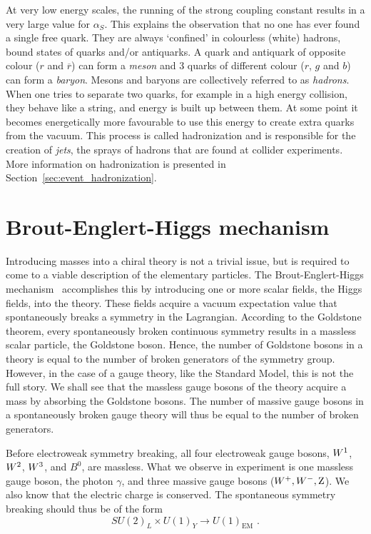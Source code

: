 At very low energy scales, the running of the strong coupling constant results in a very large
value for $\alpha_S$. This explains the observation that no one has ever found a single free quark. 
They are always `confined' in colourless (white) hadrons, \ie bound states of quarks and/or
antiquarks.  A quark and antiquark of opposite colour (\eg $r$ and $\overline{r}$) can form a
\textit{meson} and 3 quarks of different colour ($r$, $g$ and $b$) can form a \textit{baryon}. 
Mesons and baryons are collectively referred to as \textit{hadrons}.
When one tries to separate two quarks, for example in a high energy collision, they behave like a
string, and energy is built up between them. At some point it becomes energetically more favourable
to use this energy to create extra quarks from the vacuum. 
This process is called hadronization and is responsible for the creation of \textsl{jets}, the
sprays of hadrons that are found at collider experiments. More information on hadronization is
presented in Section~\ref{sec:event_hadronization}.


\section{Brout-Englert-Higgs mechanism \label{sec:SM_HiggsMechanism}}

Introducing masses into a chiral theory is not a trivial issue, but is required to come to a viable
description of the elementary particles. 
The Brout-Englert-Higgs mechanism~\cite{Englert:1964et,Higgs:1964pj} accomplishes this by
introducing one or more scalar fields, the
Higgs fields, into the theory. These fields acquire a vacuum expectation value that spontaneously
breaks a symmetry in the Lagrangian. 
According to the Goldstone theorem, every spontaneously broken continuous symmetry
results in a massless scalar particle, the Goldstone boson. 
Hence, the number of Goldstone bosons in a theory is equal to the number of broken generators of
the symmetry group. 
However, in the case of a gauge theory, like the Standard Model, this is not the full story. 
We shall see that the massless gauge bosons of the theory acquire a mass by absorbing the Goldstone
bosons. 
The number of massive gauge bosons in a spontaneously broken gauge theory will thus be equal to the
number of broken generators. 


Before electroweak symmetry breaking, all four electroweak gauge bosons, $W^1$, $W^2$, $W^3$,
and $B^0$, are massless. What we observe in experiment is one massless gauge boson, the photon
$\gamma$, and three massive gauge bosons ($W^+, W^-, \mathrm{Z}$). We also know that the electric charge
is conserved. The spontaneous symmetry breaking should thus be of the form
\begin{equation*}
  SU(2)_L \times U(1)_Y \rightarrow U(1)_{\text{EM}} \textrm{ .}
\end{equation*}

